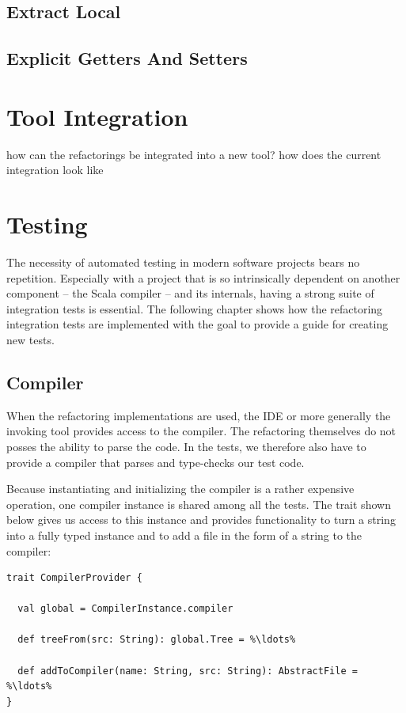 \documentclass[10pt,a4paper,oneside]{scrreprt}
\begin{document}
\section{Extract Local}
\section{Explicit Getters And Setters}


\chapter{Tool Integration} \label{chapter:tool-integration}

how can the refactorings be integrated into a new tool?
how does the current integration look like

\chapter{Testing} \label{chapter:testing}

The necessity of automated testing in modern software projects bears no repetition. Especially with a project that is so intrinsically dependent on another component -- the Scala compiler -- and its internals, having a strong suite of integration tests is essential. The following chapter shows how the refactoring integration tests are implemented with the goal to provide a guide for creating new tests.

\section{Compiler}

When the refactoring implementations are used, the IDE or more generally the invoking tool provides access to the compiler. The refactoring themselves do not posses the ability to parse the code. In the tests, we therefore also have to provide a compiler that parses and type-checks our test code.

Because instantiating and initializing the compiler is a rather expensive operation, one compiler instance is shared among all the tests. The  trait shown below gives us access to this instance and provides functionality to turn a string into a fully typed  instance and to add a file in the form of a string to the compiler:

\begin{lstlisting}
trait CompilerProvider {

  val global = CompilerInstance.compiler
    
  def treeFrom(src: String): global.Tree = %\ldots%
  
  def addToCompiler(name: String, src: String): AbstractFile = %\ldots%
}
\end{lstlisting}
\end{document}
